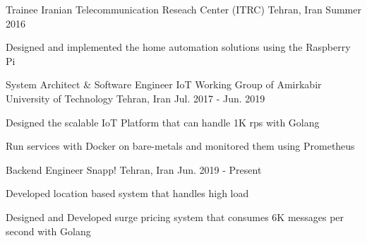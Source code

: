 

\begin{cventries}

  \cventry
    {Trainee} %
    {Iranian Telecommunication Reseach Center (ITRC)} %
    {Tehran, Iran} %
    {Summer 2016} %
    {
      \begin{cvitems} %
        \item {Designed and implemented the home automation solutions using the Raspberry Pi}
      \end{cvitems}
    }


  \cventry
    {System Architect \& Software Engineer} %
    {IoT Working Group of Amirkabir University of Technology} %
    {Tehran, Iran} %
    {Jul. 2017 - Jun. 2019} %
    {
      \begin{cvitems} %
        \item {Designed the scalable IoT Platform that can handle 1K rps with Golang}
        \item {Run services with Docker on bare-metals and monitored them using Prometheus}
      \end{cvitems}
    }


  \cventry
    {Backend Engineer} %
    {Snapp!} %
    {Tehran, Iran} %
    {Jun. 2019 - Present} %
    {
      \begin{cvitems} %
        \item {Developed location based system that handles high load}
        \item {Designed and Developed surge pricing system that consumes 6K messages per second with Golang}
      \end{cvitems}
    }

\end{cventries}
